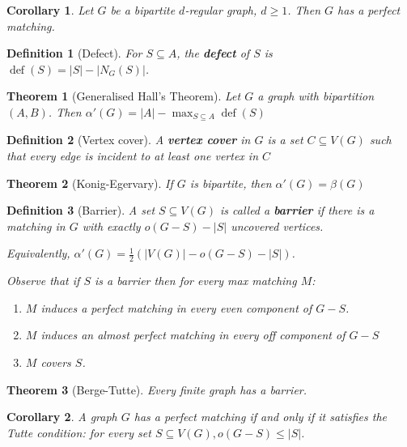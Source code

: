 \documentclass{article}
\newcommand{\size}[1]{|#1|}
\newcommand{\st}{such that }
\DeclareMathOperator*{\defect}{def}
\newtheorem*{definition}{Definition}
\newtheorem*{theorem}{Theorem}
\newtheorem*{corollary}{Corollary}
\begin{document}
\begin{corollary}
    Let $ G $ be a bipartite $ d $-regular graph, $ d \geq 1 $. Then $ G $ has a perfect matching.
\end{corollary}

\begin{definition}[Defect]
    For $ S \subseteq A $, the \textbf{defect} of $ S $ is $ \defect(S) = \size{S} - \size{N_G(S)} $.
\end{definition}

\begin{theorem}[Generalised Hall's Theorem]
    Let $ G $ a graph with bipartition $ (A,B) $. Then $ \alpha'(G) = \size{A} - \max_{S \subseteq A}\defect(S) $
\end{theorem}

\begin{definition}[Vertex cover]
    A \textbf{vertex cover} in $ G $ is a set $ C \subseteq V(G) $ \st every edge is incident to at least one vertex in $ C $
\end{definition}

\begin{theorem}[Konig-Egervary]
    If $ G $ is bipartite, then $ \alpha'(G) = \beta(G) $
\end{theorem}

\begin{definition}[Barrier]
    A set $ S \subseteq V(G) $ is called a \textbf{barrier} if there is a matching in $ G $ with exactly
    $ o(G - S) - \size{S} $ uncovered vertices.

    Equivalently, $ \alpha'(G) = \frac{1}{2}(\size{V(G)} - o(G - S) - \size{S}) $.

    Observe that if $ S $ is a barrier then for every max matching $ M $:
    \begin{enumerate}
        \item $ M $ induces a perfect matching in every even component of $ G - S $.
        \item $ M $ induces an almost perfect matching in every off component of $ G - S $
        \item $ M $ covers $ S $.
    \end{enumerate}
\end{definition}

\begin{theorem}[Berge-Tutte]
    Every finite graph has a barrier.
\end{theorem}

\begin{corollary}
    A graph $ G $ has a perfect matching if and only if it satisfies the Tutte condition:
    for every set $ S \subseteq V(G) , o(G - S) \leq \size{S} $.
\end{corollary}
\end{document}
